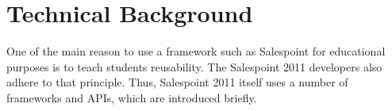 \chapter{Technical Background}
One of the main reason to use a framework such as Salespoint for educational purposes is to teach students reusability.
The Salespoint 2011 developers also adhere to that principle.
Thus, Salespoint 2011 itself uses a number of frameworks and APIs, which are introduced briefly.



